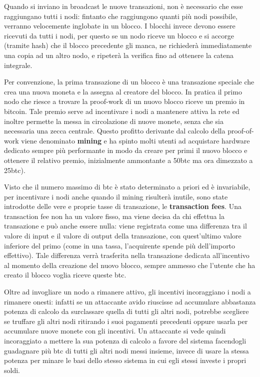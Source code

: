 Quando si inviano in broadcast le nuove transazioni, non è necessario che esse raggiungano tutti i nodi: fintanto che raggiungono quanti più nodi possibile, verranno velocemente inglobate in un blocco. I blocchi invece devono essere ricevuti da tutti i nodi, per questo se un nodo riceve un blocco e si accorge (tramite hash) che il blocco precedente gli manca, ne richiederà immediatamente una copia ad un altro nodo, e ripeterà la verifica fino ad ottenere la catena integrale.

Per convenzione, la prima transazione di un blocco è una transazione speciale che crea una nuova moneta e la assegna al creatore del blocco. In pratica il primo nodo che riesce a trovare la proof-work di un nuovo blocco riceve un premio in bitcoin. Tale premio serve ad incentivare i nodi a mantenere attiva la rete ed inoltre permette la messa in circolazione di nuove monete, senza che sia necessaria una zecca centrale. Questo profitto derivante dal calcolo della proof-of-work viene denominato \textbf{mining} e ha spinto molti utenti ad acquistare hardware dedicato sempre più performante in modo da creare per primi il nuovo blocco e ottenere il relativo premio, inizialmente ammontante a 50btc ma ora dimezzato a 25btc).

Visto che il numero massimo di btc è stato determinato a priori ed è invariabile, per incentivare i nodi anche quando il mining risulterà inutile, sono state introdotte delle vere e proprie tasse di transazione, le \textbf{transaction fees}. Una transaction fee non ha un valore fisso, ma viene decisa da chi effettua la transazione e può anche essere nulla: viene registrata come una differenza tra il valore di input e il valore di output della transazione, con quest'ultimo valore inferiore del primo (come in una tassa, l'acquirente spende più dell'importo effettivo). Tale differenza verrà trasferita nella transazione dedicata all'incentivo al momento della creazione del nuovo blocco, sempre ammesso che l'utente che ha creato il blocco voglia riceve queste btc.

Oltre ad invogliare un nodo a rimanere attivo, gli incentivi incoraggiano i nodi a rimanere onesti: infatti se un attaccante avido riuscisse ad accumulare abbastanza potenza di calcolo da surclassare quella di tutti gli altri nodi, potrebbe scegliere se truffare gli altri nodi ritirando i suoi pagamenti precedenti oppure usarla per accumulare nuove monete con gli incentivi. Un attaccante si vede quindi incoraggiato a mettere la sua potenza di calcolo a favore del sistema facendogli guadagnare più btc di tutti gli altri nodi messi insieme, invece di usare la stessa potenza per minare le basi dello stesso sistema in cui egli stessi investe i propri soldi.

